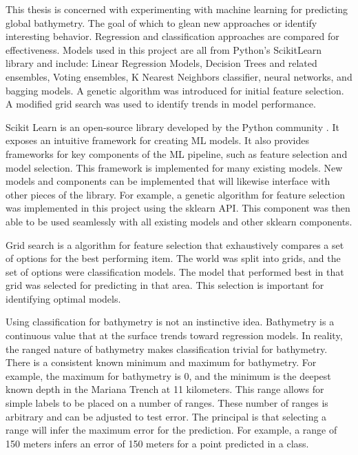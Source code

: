 \par
This thesis is concerned with experimenting with machine learning for predicting global bathymetry.
The goal of which to glean new approaches or identify interesting behavior.
Regression and classification approaches are compared for effectiveness.
Models used in this project are all from Python's ScikitLearn library and include: Linear Regression Models, Decision Trees and related ensembles, Voting ensembles, K Nearest Neighbors classifier, neural networks, and bagging models.
A genetic algorithm was introduced for initial feature selection.
A modified grid search was used to identify trends in model performance.

\par
Scikit Learn is an open-source library developed by the Python community \cite{scikit-learn}.
It exposes an intuitive framework for creating \ac{ML} models.
It also provides frameworks for key components of the \ac{ML} pipeline, such as feature selection and model selection.
This framework is implemented for many existing models.
New models and components can be implemented that will likewise interface with other pieces of the library.
For example, a genetic algorithm for feature selection was implemented in this project using the sklearn \ac{API}.
This component was then able to be used seamlessly with all existing models and other sklearn components.

\par
Grid search is a algorithm for feature selection that exhaustively compares a set of options for the best performing item.
The world was split into grids, and the set of options were classification models.
The model that performed best in that grid was selected for predicting in that area.
This selection is important for identifying optimal models.


\par
Using classification for bathymetry is not an instinctive idea.
Bathymetry is a continuous value that at the surface trends toward regression models.
In reality, the ranged nature of bathymetry makes classification trivial for bathymetry.
There is a consistent known minimum and maximum for bathymetry.
For example, the maximum for bathymetry is 0, and the minimum is the deepest known depth in the Mariana Trench at 11 kilometers.
This range allows for simple labels to be placed on a number of ranges.
These number of ranges is arbitrary and can be adjusted to test error.
The principal is that selecting a range will infer the maximum error for the prediction.
For example, a range of 150 meters infers an error of 150 meters for a point predicted in a class.




